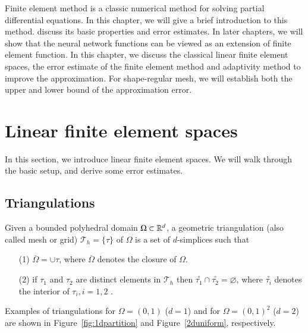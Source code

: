 Finite element method is a classic numerical method for solving partial differential equations. In this chapter, we 
will give a brief introduction to this method. discuss its basic properties and error estimates. In later chapters, we 
will show that the neural network functions can be viewed as an extension of finite element function. 
In this chapter, we discuss the classical linear finite element spaces, the error estimate of the 
finite element method and adaptivity method to improve the
approximation. For shape-regular mesh, we will establish both the upper and lower bound of the 
approximation error. 


\section{Linear finite element spaces}\label{FEspace}
In this section, we introduce linear finite element spaces. We will walk through the basic setup, 
and derive some error estimates. 

\subsection{Triangulations}


Given a bounded polyhedral domain $\Omega\subset \mathbb {R}^d$, a geometric
triangulation (also called mesh or grid) $\mathcal T_h=\{\tau\}$ of $\Omega$ is a
set of $d$-simplices such that
\begin{enumerate}
\item[(1)] $\overline \Omega=\cup \tau$, where $ \overline \Omega$ denotes the closure of $\Omega$. 
\item[(2)]  if $\tau_1$ and $\tau_2$ are distinct elements in $\mathcal T_h$ then $\stackrel{\circ}{\tau _1}\cap \stackrel{\circ}{\tau _2} = \varnothing$, where $\stackrel{\circ}{\tau _i}$ denotes the interior of $\tau_i, i=1,2$ . 
\end{enumerate}
Examples of triangulations for $\Omega=(0,1)$ ($d=1$) and for $\Omega=(0,1)^2$ ($d=2$) are shown in
Figure~\ref{fig:1dpartition} and Figure~\ref{2duniform}, respectively.

